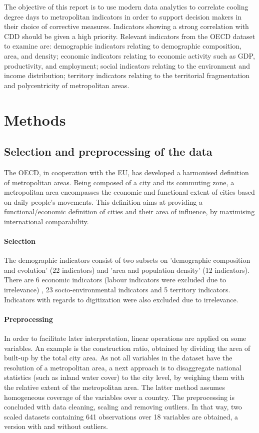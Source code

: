 \documentclass[fleqn,10pt]{SelfArx} %
\begin{document}
The objective of this report is to use modern data analytics to correlate cooling degree days to metropolitan indicators in order to support decision makers in their choice of corrective measures.  Indicators showing a strong correlation with CDD should be given a high priority.  Relevant indicators from the OECD dataset to examine are: demographic indicators relating to demographic composition, area, and density; economic indicators relating to economic activity such as GDP, productivity, and employment; social indicators relating to the environment and income distribution; territory indicators relating to the territorial fragmentation and polycentricity of metropolitan areas.

\section{Methods}

\subsection{Selection and preprocessing of the data}

The  OECD, in cooperation with the EU, has developed a harmonised definition of metropolitan areas.  Being composed of a city and its commuting zone,  a metropolitan area encompasses the economic and functional extent of cities based on daily people’s movements. This definition aims at providing a functional/economic definition of cities and their area of influence, by maximising international comparability.

\paragraph{Selection} The demographic indicators consist of two subsets on 'demographic composition and evolution' (22 indicators) and 'area and population density' (12 indicators).  There are 6 economic indicators (labour indicators were excluded due to irrelevance) , 23 socio-environmental indicators and 5 territory indicators. Indicators with regards to digitization were also excluded due to irrelevance.
\paragraph{Preprocessing} In order to facilitate later interpretation, linear operations are applied on some variables. An example is the construction ratio, obtained by dividing the area of built-up by the total city area. As not all variables in the dataset have the resolution of a metropolitan area, a next approach is to disaggregate national statistics (such as inland water cover) to the city level, by weighing them with the relative extent of the metropolitan area. The latter method assumes homogeneous coverage of the variables over a country. The preprocessing is concluded with data cleaning, scaling and removing outliers. In that way, two scaled datasets containing 641 observations over 18 variables are obtained, a version with and without outliers. 
\end{document}
